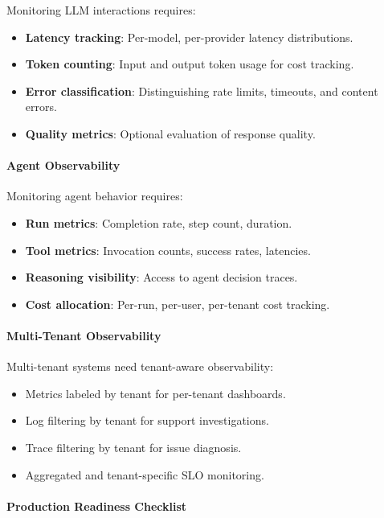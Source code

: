 Monitoring LLM interactions requires:
\begin{itemize}
    \item \textbf{Latency tracking}: Per-model, per-provider latency distributions.
    \item \textbf{Token counting}: Input and output token usage for cost tracking.
    \item \textbf{Error classification}: Distinguishing rate limits, timeouts, and content errors.
    \item \textbf{Quality metrics}: Optional evaluation of response quality.
\end{itemize}

\paragraph{Agent Observability}

Monitoring agent behavior requires:
\begin{itemize}
    \item \textbf{Run metrics}: Completion rate, step count, duration.
    \item \textbf{Tool metrics}: Invocation counts, success rates, latencies.
    \item \textbf{Reasoning visibility}: Access to agent decision traces.
    \item \textbf{Cost allocation}: Per-run, per-user, per-tenant cost tracking.
\end{itemize}

\paragraph{Multi-Tenant Observability}

Multi-tenant systems need tenant-aware observability:
\begin{itemize}
    \item Metrics labeled by tenant for per-tenant dashboards.
    \item Log filtering by tenant for support investigations.
    \item Trace filtering by tenant for issue diagnosis.
    \item Aggregated and tenant-specific SLO monitoring.
\end{itemize}

\paragraph{Production Readiness Checklist}

